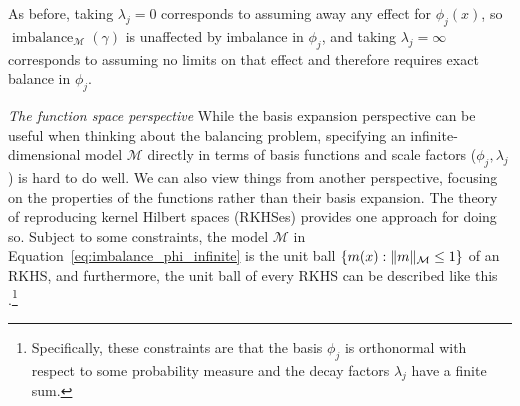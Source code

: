 \documentclass{article}
\newcommand{\subsubsection}[1]{\par\noindent\textit{#1}\enspace}
\DeclarePairedDelimiter\norm{\lVert}{\rVert}
\theoremstyle{definition}
\DeclareMathOperator{\imbalance}{imbalance}
\newcommand{\model}{\mathcal{M}}
\newcommand{\<}{\langle}
\renewcommand{\>}{\rangle}
\newcommand\cmnt[2]{\;
{\textcolor{red}{[{\em #1 --- #2}] \;}
}}
\newcommand\avi[1]{\cmnt{#1}{Avi}}
\begin{document}
As before, taking $\lambda_j=0$ corresponds to assuming away any effect for $\phi_j(x)$, so  $\imbalance_\model(\gamma)$ is unaffected by imbalance in $\phi_j$, and taking $\lambda_j=\infty$ corresponds to assuming no limits on that effect and therefore requires exact balance in $\phi_j$.

\subsubsection{The function space perspective}
\label{sec:function-space-perspective}
While the basis expansion perspective can be useful when thinking about the balancing problem, specifying an infinite-dimensional model $\model$
directly in terms of basis functions and scale factors ($\phi_j, \lambda_j$) is hard to do well. We can also view things from another perspective,
focusing on the properties of the functions rather than their basis expansion.
The theory of reproducing kernel Hilbert spaces (RKHSes) provides one approach for doing so. Subject to some constraints, the model $\model$ in Equation~\ref{eq:imbalance_phi_infinite} is the unit ball $\{m(x) : \norm{m}_\model \le 1\}$ of an RKHS,
and furthermore, the unit ball of every RKHS can be described like this  \citep[see, e.g.,][Chapters 2 and 4]{cucker2007learning}.\footnote{Specifically, these constraints are that the basis $\phi_j$ is orthonormal with respect to some probability measure and the decay factors $\lambda_j$ have a finite sum.}  %
\end{document}
